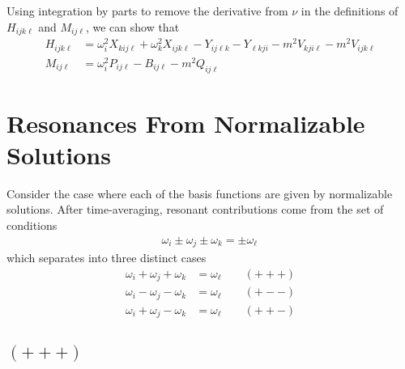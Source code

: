 \documentclass[letterpaper,11pt]{article}
\newcommand{\oi}{\omega_i}
\newcommand{\oj}{\omega_j}
\newcommand{\ok}{\omega_k}
\newcommand{\ol}{\omega_\ell}
\begin{document}
Using integration by parts to remove the derivative from $\nu$ in the definitions of $H_{ijk\ell}$ and $M_{ij\ell}$, we can show that
\begin{align}
H_{ijk\ell} &= \oi^2 X_{kij\ell} + \ok^2 X_{ijk\ell} - Y_{ij\ell k}  - Y_{\ell kji}   - m^2 V_{kji\ell} -m^2 V_{ijk\ell} \\
M_{ij\ell} &= \oi^2 P_{ij\ell} - B_{ij\ell} -m^2 Q_{ij\ell}
\end{align}


\section{Resonances From Normalizable Solutions}
\label{sec: norm res}
Consider the case where each of the basis functions are given by normalizable solutions. After time-averaging, resonant contributions come from the set of conditions
\begin{align}
\label{gen res}
\oi \pm \oj \pm \ok = \pm \ol \,
\end{align}
which separates into three distinct cases
\begin{align}
\oi + \oj + \ok &= \ol \qquad (+++) \\
\oi - \oj - \ok &= \ol \qquad (+--) \\
\oi + \oj - \ok &= \ol \qquad (++-)
\end{align}


\subsection{$(+++)$}
\end{document}

